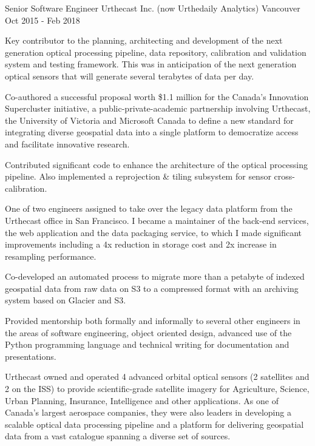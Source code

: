 \begin{cventries}
  \cventrywithsummary
    {Senior Software Engineer} %
    {Urthecast Inc. (now Urthedaily Analytics)} %
    {Vancouver} %
    {Oct 2015 - Feb 2018} %
    {
      \begin{cvitems} %
        \item {Key contributor to the planning, architecting and development of the next generation optical processing pipeline, data repository, calibration and validation system and testing framework. This was in anticipation of the next generation optical sensors that will generate several terabytes of data per day.}
        \item {Co-authored a successful proposal worth \$1.1 million for the Canada's Innovation Supercluster initiative, a public-private-academic partnership involving Urthecast, the University of Victoria and Microsoft Canada to define a new standard for integrating diverse geospatial data into a single platform to democratize access and facilitate innovative research.}
        \item {Contributed significant code to enhance the architecture of the optical processing pipeline. Also implemented a reprojection \& tiling subsystem for sensor cross-calibration.}
        \item {One of two engineers assigned to take over the legacy data platform from the Urthecast office in San Francisco. I became a maintainer of the back-end services, the web application and the data packaging service, to which I made significant improvements including a 4x reduction in storage cost and 2x increase in resampling performance.}
        \item {Co-developed an automated process to migrate more than a petabyte of indexed geospatial data from raw data on S3 to a compressed format with an archiving system based on Glacier and S3.}
        \item {Provided mentorship both formally and informally to several other engineers in the areas of software engineering, object oriented design, advanced use of the Python programming language and technical writing for documentation and presentations.}
      \end{cvitems}
    }
    {
      Urthecast owned and operated 4 advanced orbital optical sensors (2 satellites and 2 on the ISS) to provide scientific-grade satellite imagery for Agriculture, Science, Urban Planning, Insurance, Intelligence and other applications. As one of Canada's largest aerospace companies, they were also leaders in developing a scalable optical data processing pipeline and a platform for delivering geospatial data from a vast catalogue spanning a diverse set of sources.
    }


\end{cventries}
